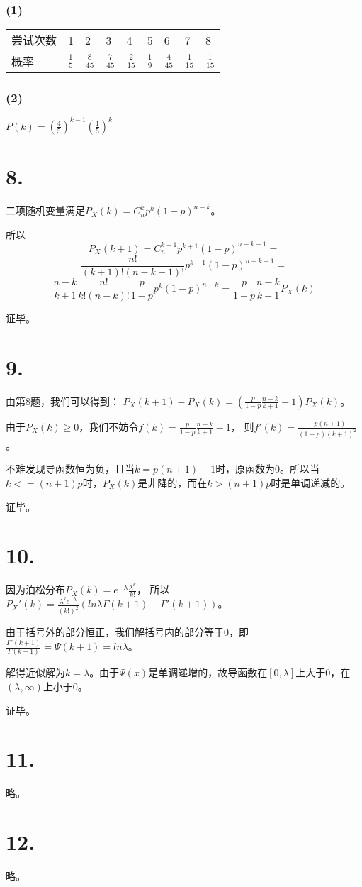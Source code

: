 \documentclass[UTF8]{report}
\begin{document}
            \subsubsection*{(1)}
                \begin{table}[!htbp]
                    \begin{tabular}{lllllllll}
                        尝试次数 & 1 & 2 & 3 & 4 & 5 & 6 & 7 & 8\\
                        概率 & $\frac{1}{5}$ & $\frac{8}{45}$ & $\frac{7}{45}$ & $\frac{2}{15}$ & $\frac{1}{9}$ & $\frac{4}{45}$ & $\frac{1}{15}$ & $\frac{1}{15}$
                    \end{tabular}
                \end{table}
            \subsubsection*{(2)}
                $P(k) = (\frac{4}{5})^{k - 1}(\frac{1}{5})^k$
    \section*{8.}
        二项随机变量满足$P_X(k) = C_n^kp^k(1 - p)^{n - k}$。
        
        所以
        $$P_X(k + 1) = C_n^{k + 1}p^{k + 1}(1 - p)^{n - k - 1} = $$
        $$\frac{n!}{(k + 1)!(n - k -1)!}p^{k + 1}(1 - p)^{n - k - 1} = $$
        $$\frac{n - k}{k + 1}\frac{n!}{k!(n - k)!}\frac{p}{1 - p}p^k(1 - p)^{n - k} = \frac{p}{1 - p}\frac{n - k}{k + 1}P_X(k)$$

        证毕。
    \section*{9.}
        由第8题，我们可以得到：
        $P_X(k + 1) - P_X(k) = (\frac{p}{1 - p}\frac{n - k}{k + 1} - 1)P_X(k)$。

        由于$P_X(k) \geq 0$，我们不妨令$f(k) = \frac{p}{1 - p}\frac{n - k}{k + 1} - 1$，
        则$f'(k) = \frac{-p(n + 1)}{(1 - p)(k + 1)^2}$。

        不难发现导函数恒为负，且当$k = p(n + 1) - 1$时，原函数为0。所以当$k <= (n + 1)p$时，$P_X(k)$是非降的，而在$k > (n + 1)p$时是单调递减的。

        证毕。
    \section*{10.}
        因为泊松分布$P_X(k) = e^{-\lambda}\frac{\lambda^k}{k!}$，
        所以$P_X'(k) = \frac{\lambda^ke^{-\lambda}}{(k!)^2}(ln\lambda\Gamma(k + 1) - \Gamma'(k + 1))$。

        由于括号外的部分恒正，我们解括号内的部分等于0，即$\frac{\Gamma'(k + 1)}{\Gamma(k + 1)} = \Psi(k + 1) = ln\lambda$。

        解得近似解为$k = \lambda$。由于$\Psi(x)$是单调递增的，故导函数在$[0, \lambda]$上大于0，在$(\lambda, \infty)$上小于0。

        证毕。
    \section*{11.}
        略。
    \section*{12.}
        略。
\end{document}
